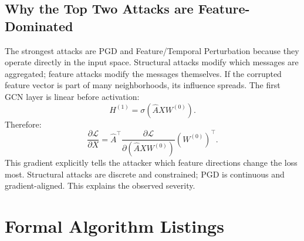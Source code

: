 \documentclass[12pt,oneside]{report}
\begin{document}
\section{Why the Top Two Attacks are Feature-Dominated}
The strongest attacks are PGD and Feature/Temporal Perturbation because they operate directly in the input space. Structural attacks modify which messages are aggregated; feature attacks modify the messages themselves. If the corrupted feature vector is part of many neighborhoods, its influence spreads. The first GCN layer is linear before activation:
$$
H^{(1)}=\sigma(\hat{A}XW^{(0)}).
$$
Therefore:
$$
\frac{\partial \mathcal{L}}{\partial X}
=\hat{A}^{\top}\frac{\partial \mathcal{L}}{\partial(\hat{A}XW^{(0)})}(W^{(0)})^\top.
$$
This gradient explicitly tells the attacker which feature directions change the loss most. Structural attacks are discrete and constrained; PGD is continuous and gradient-aligned. This explains the observed severity.

\chapter{Formal Algorithm Listings}
\end{document}
